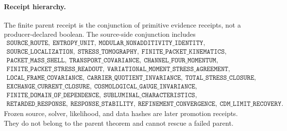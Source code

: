\paragraph{Receipt hierarchy.}
The finite parent receipt is the conjunction of primitive evidence receipts,
not a producer-declared boolean.  The source-side conjunction includes
\[
\begin{gathered}
\texttt{SOURCE\_ROUTE},\ \texttt{ENTROPY\_UNIT},\
\texttt{MODULAR\_NONADDITIVITY\_IDENTITY},\\
\texttt{SOURCE\_LOCALIZATION},\
\texttt{STRESS\_TOMOGRAPHY},\
\texttt{FINITE\_PACKET\_KINEMATICS},\\
\texttt{PACKET\_MASS\_SHELL},\
\texttt{TRANSPORT\_COVARIANCE},\
\texttt{CHANNEL\_FOUR\_MOMENTUM},\\
\texttt{FINITE\_PACKET\_STRESS\_READOUT},\
\texttt{VARIATIONAL\_MOMENT\_STRESS\_AGREEMENT},\\
\texttt{LOCAL\_FRAME\_COVARIANCE},\
\texttt{CARRIER\_QUOTIENT\_INVARIANCE},\
\texttt{TOTAL\_STRESS\_CLOSURE},\\
\texttt{EXCHANGE\_CURRENT\_CLOSURE},\
\texttt{COSMOLOGICAL\_GAUGE\_INVARIANCE},\\
\texttt{FINITE\_DOMAIN\_OF\_DEPENDENCE},\
\texttt{SUBLUMINAL\_CHARACTERISTICS},\\
\texttt{RETARDED\_RESPONSE},\
\texttt{RESPONSE\_STABILITY},\
\texttt{REFINEMENT\_CONVERGENCE},\
\texttt{CDM\_LIMIT\_RECOVERY}.
\end{gathered}
\]
Frozen source, solver, likelihood, and data hashes are later promotion receipts.
They do not belong to the parent theorem and cannot rescue a failed parent.
